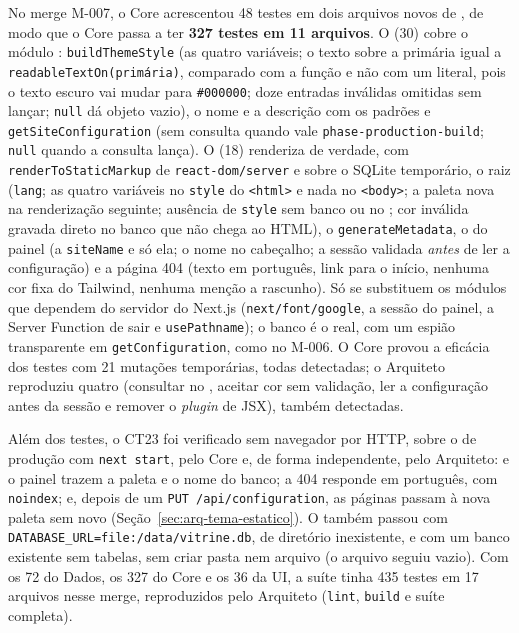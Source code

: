 No merge M-007, o Core acrescentou 48 testes em dois arquivos novos de , de modo que o Core passa a ter \textbf{327 testes em 11 arquivos}. O  (30) cobre o módulo : \texttt{buildThemeStyle} (as quatro variáveis; o texto sobre a primária igual a \texttt{readableTextOn(primária)}, comparado com a função e não com um literal, pois o texto escuro vai mudar para \texttt{\#000000}; doze entradas inválidas omitidas sem lançar; \texttt{null} dá objeto vazio), o nome e a descrição com os padrões e \texttt{getSiteConfiguration} (sem consulta quando  vale \texttt{phase-production-build}; \texttt{null} quando a consulta lança). O  (18) renderiza de verdade, com \texttt{renderToStaticMarkup} de \texttt{react-dom/server} e sobre o SQLite temporário, o  raiz (\texttt{lang}; as quatro variáveis no \texttt{style} do \texttt{<html>} e nada no \texttt{<body>}; a paleta nova na renderização seguinte; ausência de \texttt{style} sem banco ou no ; cor inválida gravada direto no banco que não chega ao HTML), o \texttt{generateMetadata}, o  do painel (a  \texttt{siteName} e só ela; o nome no cabeçalho; a sessão validada \emph{antes} de ler a configuração) e a página 404 (texto em português, link para o início, nenhuma cor fixa do Tailwind, nenhuma menção a rascunho). Só se substituem os módulos que dependem do servidor do Next.js (\texttt{next/font/google}, a sessão do painel, a Server Function de sair e \texttt{usePathname}); o banco é o real, com um espião transparente em \texttt{getConfiguration}, como no M-006. O Core provou a eficácia dos testes com 21 mutações temporárias, todas detectadas; o Arquiteto reproduziu quatro (consultar no , aceitar cor sem validação, ler a configuração antes da sessão e remover o \emph{plugin} de JSX), também detectadas.

Além dos testes, o CT23 foi verificado sem navegador por HTTP, sobre o  de produção com \texttt{next start}, pelo Core e, de forma independente, pelo Arquiteto:  e o painel trazem a paleta e o nome do banco; a 404 responde em português, com \texttt{noindex}; e, depois de um \texttt{PUT /api/configuration}, as páginas passam à nova paleta sem novo  (Seção~\ref{sec:arq-tema-estatico}). O  também passou com \texttt{DATABASE\_URL=file:/data/vitrine.db}, de diretório inexistente, e com um banco existente sem tabelas, sem criar pasta nem arquivo (o arquivo seguiu vazio). Com os 72 do Dados, os 327 do Core e os 36 da UI, a suíte tinha 435 testes em 17 arquivos nesse merge, reproduzidos pelo Arquiteto (\texttt{lint}, \texttt{build} e suíte completa).

